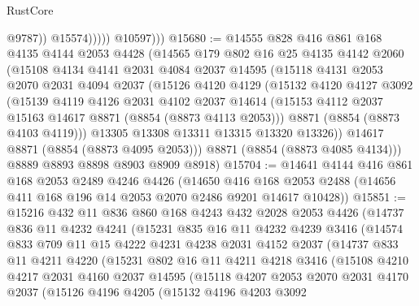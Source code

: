 \begin{lexlean}{RustCore}
\begin{coremodule}
                        @9787))
                    @15574)))))
          @10597)))
@15680 := @14555
    @828
    @416
    @861
    @168
    @4135
    @4144
    @2053
    @4428
    (@14565
      @179
      @802
      @16
      @25
      @4135
      @4142
      @2060
      (@15108
        @4134
        @4141
        @2031
        @4084
        @2037
        @14595
        (@15118
          @4131
          @2053
          @2070
          @2031
          @4094
          @2037
          (@15126
            @4120
            @4129
            (@15132
              @4120
              @4127
              @3092
              (@15139
                @4119
                @4126
                @2031
                @4102
                @2037
                @14614
                (@15153 @4112 @2037 @15163 @14617 @8871 (@8854 (@8873 @4113 @2053)))
                @8871
                (@8854 (@8873 @4103 @4119)))
              @13305
              @13308
              @13311
              @13315
              @13320
              @13326))
          @14617
          @8871
          (@8854 (@8873 @4095 @2053)))
        @8871
        (@8854 (@8873 @4085 @4134)))
      @8889
      @8893
      @8898
      @8903
      @8909
      @8918)
@15704 := @14641
    @4144
    @416
    @861
    @168
    @2053
    @2489
    @4246
    @4426
    (@14650 @416 @168 @2053 @2488 (@14656 @411 @168 @196 @14 @2053 @2070 @2486 @9201 @14617 @10428))
@15851 := @15216
    @432
    @11
    @836
    @860
    @168
    @4243
    @432
    @2028
    @2053
    @4426
    (@14737
      @836
      @11
      @4232
      @4241
      (@15231
        @835
        @16
        @11
        @4232
        @4239
        @3416
        (@14574
          @833
          @709
          @11
          @15
          @4222
          @4231
          @4238
          @2031
          @4152
          @2037
          (@14737
            @833
            @11
            @4211
            @4220
            (@15231
              @802
              @16
              @11
              @4211
              @4218
              @3416
              (@15108
                @4210
                @4217
                @2031
                @4160
                @2037
                @14595
                (@15118
                  @4207
                  @2053
                  @2070
                  @2031
                  @4170
                  @2037
                  (@15126
                    @4196
                    @4205
                    (@15132
                      @4196
                      @4203
                      @3092

\end{coremodule}
\end{lexlean}
